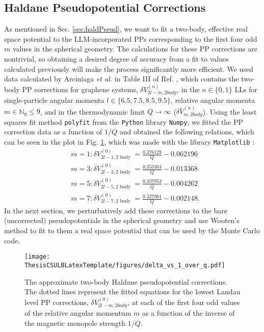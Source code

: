    \subsection{Haldane Pseudopotential Corrections} \label{ssec:pseudCorr}
    As mentioned in Sec. \ref{sec:haldPseud}, we want to fit a two-body, effective real space potential to the LLM-incorporated PPs corresponding to the first four odd $m$ values in the spherical geometry. The calculations for these PP corrections are nontrivial, so obtaining a desired degree of accuracy from a fit to values calculated previously will make the process significantly more efficient. We used data calculated by Arciniaga \textit{et al.} in Table III of Ref. \cite{arciniaga}, which contains the two-body PP corrections for graphene systems, $\delta V^{(n)}_{2l-m,2body}$, in the $n\in\{0,1\}$ LLs for single-particle angular momenta $l\in\{6.5,7.5,8.5,9.5\}$, relative angular momenta $m\in\mathbb{N}_0\leq9$, and in the thermodynamic limit $Q\rightarrow\infty$ ($\delta\bar{V}^{(n)}_{m,2body}$). Using the least squares fit method \texttt{polyfit} from the \texttt{Python} library \texttt{Numpy}, we fitted the PP correction data as a function of $1/Q$ and obtained the following relations, which can be seen in the plot in Fig. \ref{fig:delta_vs_1_over_q}, which was made with the library \texttt{Matplotlib} \cite{numpy,matplotlib}:
    \begin{eqnarray} \label{eq:first_pp_corr}
    &m=1: \delta V_{2 l-1,2 \text { body }}^{(0)}=\frac{0.376129}{Q}-0.062196 \\
    &m=3: \delta V_{2 l-3,2 \text { body }}^{(0)}=\frac{0.353383 }{Q}-0.013368 \\
    &m=5: \delta V_{2 l-5,2 \text { body }}^{(0)}=\frac{0.337953 }{ Q}-0.004262 \\
    &m=7: \delta V_{2 l-7,2 \text { body }}^{(0)}=\frac{0.327081 }{ Q}-0.002148.
    \end{eqnarray} \label{eq:last_pp_corr}
    In the next section, we perturbatively add these corrections to the bare (uncorrected) pseudopotentials in the spherical geometry and use Wooten's method to fit to them a real space potential that can be used by the Monte Carlo code.
    
    \begin{figure}[h]
    \begin{center}
    \texttt{[image: ThesisCSULBLatexTemplate/figures/delta\_vs\_1\_over\_q.pdf]}
    \caption[The approximate two-body Haldane pseudopotential corrections.]{The approximate two-body Haldane pseudopotential corrections. The dotted lines represent the fitted equations for the lowest Landau level PP corrections, $\delta V^{(0)}_{2l-m,2body}$, at each of the first four odd values of the relative angular momentum $m$ as a function of the inverse of the magnetic monopole strength $1/Q$.}
    \label{fig:delta_vs_1_over_q} 
    \end{center}
    \end{figure}
    
